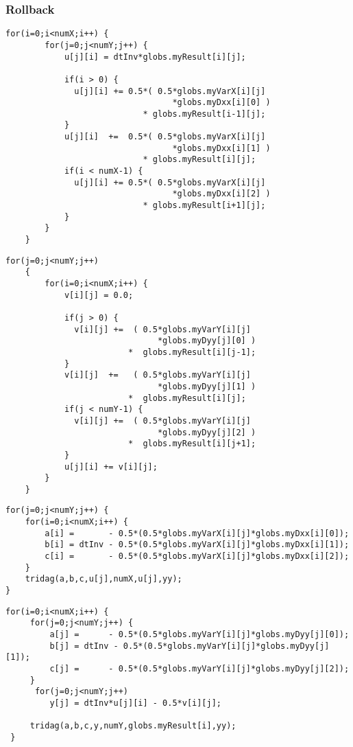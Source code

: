 \subsubsection{Rollback}
\begin{lstlisting}[caption=Explicit x loop, label=exloop]
  for(i=0;i<numX;i++) {
        for(j=0;j<numY;j++) {
            u[j][i] = dtInv*globs.myResult[i][j];

            if(i > 0) {
              u[j][i] += 0.5*( 0.5*globs.myVarX[i][j]
                                  *globs.myDxx[i][0] )
                            * globs.myResult[i-1][j];
            }
            u[j][i]  +=  0.5*( 0.5*globs.myVarX[i][j]
                                  *globs.myDxx[i][1] )
                            * globs.myResult[i][j];
            if(i < numX-1) {
              u[j][i] += 0.5*( 0.5*globs.myVarX[i][j]
                                  *globs.myDxx[i][2] )
                            * globs.myResult[i+1][j];
            }
        }
    }
\end{lstlisting}
\begin{lstlisting}[caption=Explicit y loop, label=eyloop]
    for(j=0;j<numY;j++)
    {
        for(i=0;i<numX;i++) {
            v[i][j] = 0.0;

            if(j > 0) {
              v[i][j] +=  ( 0.5*globs.myVarY[i][j]
                               *globs.myDyy[j][0] )
                         *  globs.myResult[i][j-1];
            }
            v[i][j]  +=   ( 0.5*globs.myVarY[i][j]
                               *globs.myDyy[j][1] )
                         *  globs.myResult[i][j];
            if(j < numY-1) {
              v[i][j] +=  ( 0.5*globs.myVarY[i][j]
                               *globs.myDyy[j][2] )
                         *  globs.myResult[i][j+1];
            }
            u[j][i] += v[i][j];
        }
    }
\end{lstlisting}
\begin{lstlisting}[caption=Implicit x loop, label=impxloop]
for(j=0;j<numY;j++) {
    for(i=0;i<numX;i++) {
        a[i] =		 - 0.5*(0.5*globs.myVarX[i][j]*globs.myDxx[i][0]);
        b[i] = dtInv - 0.5*(0.5*globs.myVarX[i][j]*globs.myDxx[i][1]);
        c[i] =		 - 0.5*(0.5*globs.myVarX[i][j]*globs.myDxx[i][2]);
    }
    tridag(a,b,c,u[j],numX,u[j],yy);
}
\end{lstlisting}
\begin{lstlisting}[caption=Implicit y loop, label=impyloop]
for(i=0;i<numX;i++) {
     for(j=0;j<numY;j++) {
         a[j] =		 - 0.5*(0.5*globs.myVarY[i][j]*globs.myDyy[j][0]);
         b[j] = dtInv - 0.5*(0.5*globs.myVarY[i][j]*globs.myDyy[j][1]);
         c[j] =		 - 0.5*(0.5*globs.myVarY[i][j]*globs.myDyy[j][2]);
     }
      for(j=0;j<numY;j++)
         y[j] = dtInv*u[j][i] - 0.5*v[i][j];

     tridag(a,b,c,y,numY,globs.myResult[i],yy);
 }
\end{lstlisting}

